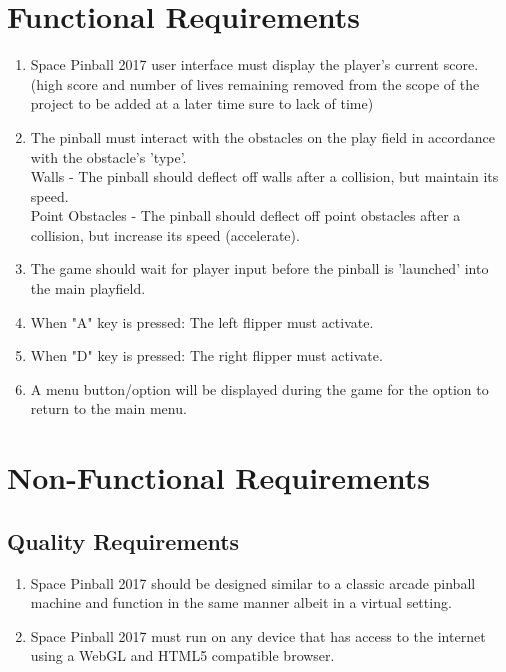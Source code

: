 \documentclass[12pt]{article}
\begin{document}
\section{Functional Requirements}
	\begin{enumerate}
		\item Space Pinball 2017 user interface must display the player's current score. (high score and number of lives remaining removed from the scope of the project to be added at a later time sure to lack of time)
		\item The pinball must interact with the obstacles on the play field in accordance with the obstacle's 'type'.\\
		Walls - The pinball should deflect off walls after a collision, but maintain its speed.\\
		Point Obstacles - The pinball should deflect off point obstacles after a collision, but increase its speed (accelerate). 
		\item The game should wait for player input before the pinball is 'launched' into the main playfield. 
		\item When "A" key is pressed: The left flipper must activate.
 \item When "D" key is pressed: The right flipper must activate.
\item A menu button/option will be displayed during the game for the option to return to the main menu.

	\end{enumerate}
\section{Non-Functional Requirements}
	\subsection{Quality Requirements}
		\begin{enumerate}

\item Space Pinball 2017 should be designed similar to a classic arcade pinball machine and function in the same manner albeit in a virtual setting.
\item Space Pinball 2017 must run on any device that has access to the internet using a WebGL and HTML5 compatible browser.
		\end{enumerate}
\end{document}
